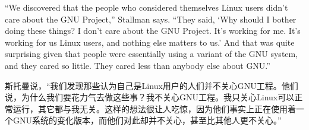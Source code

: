 
\ifdefined\eng
``We discovered that the people who considered themselves Linux users didn't care about the GNU Project,'' Stallman says. ``They said, `Why should I bother doing these things? I don't care about the GNU Project. It's working for me. It's working for us Linux users, and nothing else matters to us.' And that was quite surprising given that people were essentially using a variant of the GNU system, and they cared so little. They cared less than anybody else about GNU.''
\fi

\ifdefined\chs
斯托曼说，``我们发现那些认为自己是Linux用户的人们并不关心GNU工程。他们说，为什么我们要花力气去做这些事？我不关心GNU工程。我只关心Linux可以正常运行，其它都与我无关。这样的想法很让人吃惊，因为他们事实上正在使用着一个GNU系统的变化版本，而他们对此却并不关心，甚至比其他人更不关心。''
\fi





